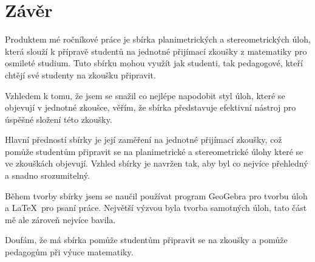 \chapter*{Závěr}
Produktem mé ročníkové práce je sbírka planimetrických a stereometrických úloh, která slouží k přípravě studentů na jednotné přijímací zkoušky z matematiky pro osmileté studium. Tuto sbírku mohou využít jak studenti, tak pedagogové, kteří chtějí své studenty na zkoušku připravit.

Vzhledem k tomu, že jsem se snažil co nejlépe napodobit styl úloh, které se objevují v jednotné zkoušce, věřím, že sbírka představuje efektivní nástroj pro úspěšné složení této zkoušky.

Hlavní předností sbírky je její zaměření na jednotné přijímací zkoušky, což pomůže studentům připravit se na planimetrické a stereometrické úlohy které se ve zkouškách objevují. Vzhled sbírky je navržen tak, aby byl co nejvíce přehledný a snadno srozumitelný.

Během tvorby sbírky jsem se naučil používat program GeoGebra pro tvorbu úloh a \LaTeX\ pro psaní práce. Největší výzvou byla tvorba samotných úloh, tato část mě ale zároveň nejvíce bavila.

Doufám, že má sbírka pomůže studentům připravit se na zkoušky a pomůže pedagogům při výuce matematiky.